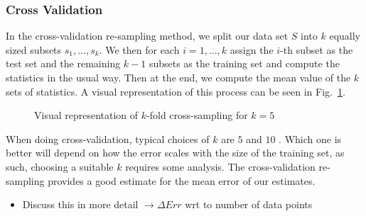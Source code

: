 \documentclass[reprint, english, nofootinbib]{revtex4-2}
\begin{document}
        \subsubsection{Cross Validation}
            \noindent
            In the cross-validation re-sampling method, we split our data set $S$ into $k$ equally sized subsets $s_1, \dots, s_k$.
            We then for each $i = 1,\dots, k$ assign the $i$-th subset as the test set and the remaining $k-1$ subsets as the training set and compute the statistics in the usual way. Then at the end, we compute the mean value of the $k$ sets of statistics. A visual representation of this process can be seen in Fig.~\ref{fig: Cross Validation}.
            \begin{figure}[h!tb]
                \center
                \vspace{5mm} %
                
                \caption{\label{fig: Cross Validation}Visual representation of $k$-fold cross-sampling for $k=5$}
            \end{figure}
            When doing cross-validation, typical choices of $k$ are $5$ and $10$ \cite{hastie}. Which one is better will depend on how the error scales with the size of the training set, as such, choosing a suitable $k$ requires some analysis.
            The cross-validation re-sampling provides a good estimate for the mean error of our estimates.
            \begin{itemize}
                \item Discuss this in more detail $\rightarrow\Delta Err$ wrt to number of data points
            \end{itemize}
\end{document}
